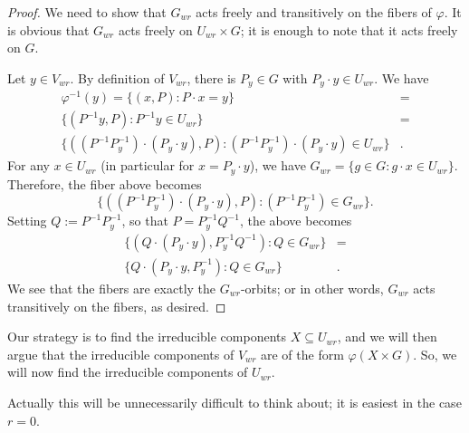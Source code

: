 \documentclass[12pt,psamsfonts]{article}
\begin{document}
\begin{proof}
    We need to show that \(G_{wr}\) acts freely and transitively on the fibers of \(\varphi\).
    It is obvious that \(G_{wr}\) acts freely on \(U_{wr} \times G\); it is enough to note that it acts freely on \(G\).
    \par Let \(y \in V_{wr}\).
    By definition of \(V_{wr}\), there is \(P_y \in G\) with \(P_y \cdot y \in U_{wr}\).
    We have
    \begin{align*}
        \varphi^{-1}(y) = \{(x, P) : P \cdot x = y \} & = \\
        \{(P^{-1} y, P) : P^{-1} y \in U_{wr} \} & = \\
        \{((P^{-1}P_y^{-1}) \cdot (P_y \cdot y), P) : (P^{-1} P_y^{-1}) \cdot (P_y \cdot y) \in U_{wr}\} & .
    \end{align*}
    For any \(x \in U_{wr}\) (in particular for \(x = P_y \cdot y\)), we have \(G_{wr} = \{g \in G : g \cdot x \in U_{wr}\}\).
    Therefore, the fiber above becomes
    \[\{((P^{-1}P_y^{-1}) \cdot (P_y \cdot y), P) : (P^{-1} P_y^{-1}) \in G_{wr}\}.\]
    Setting \(Q := P^{-1} P_y^{-1}\), so that \(P = P_y^{-1} Q^{-1}\), the above becomes
    \begin{align*}
        \{(Q \cdot (P_y \cdot y), P_y^{-1} Q^{-1}) : Q \in G_{wr}\} & = \\
        \{Q \cdot (P_y \cdot y, P_y^{-1}) : Q \in G_{wr}\} & .
    \end{align*}
        We see that the fibers are exactly the \(G_{wr}\)-orbits; or in other words, \(G_{wr}\) acts transitively on the fibers, as desired.
\end{proof}
Our strategy is to find the irreducible components \(X \subseteq U_{wr}\), and we will then argue that the irreducible components of \(V_{wr}\) are of the form \(\varphi(X \times G)\).
So, we will now find the irreducible components of \(U_{wr}\).
\par Actually this will be unnecessarily difficult to think about; it is easiest in the case \(r = 0\).
\end{document}
